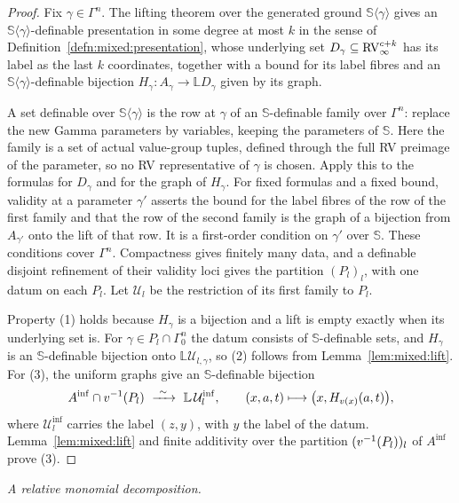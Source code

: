 \begin{proof}
Fix $\gamma\in\Gamma^n$. The lifting theorem over the generated ground
$\mathbb S\langle\gamma\rangle$ gives an
$\mathbb S\langle\gamma\rangle$-definable presentation in some degree
at most $k$ in the sense of Definition~\ref{defn:mixed:presentation},
whose underlying set $D_\gamma\subseteq\mathrm{RV}_\infty^{c+k}$ has its label as
the last $k$ coordinates, together with a bound for its label fibres and an
$\mathbb S\langle\gamma\rangle$-definable bijection
$H_\gamma:A_\gamma\to\mathbb L D_\gamma$ given by its graph.

A set definable over $\mathbb S\langle\gamma\rangle$ is the row at $\gamma$
of an $\mathbb S$-definable family over $\Gamma^n$: replace the new Gamma
parameters by variables, keeping the parameters of $\mathbb S$. Here the
family is a set of actual value-group tuples, defined through the full RV
preimage of the parameter, so no RV representative of $\gamma$ is chosen.
Apply this to the formulas for $D_\gamma$ and for the graph of $H_\gamma$.
For fixed formulas and a fixed bound, validity at a parameter $\gamma'$
asserts the bound for the label fibres of the row of the first family and
that the row of the second family is the graph of a bijection from
$A_{\gamma'}$ onto the lift of that row. It is a first-order condition on
$\gamma'$ over $\mathbb S$. These conditions cover $\Gamma^n$. Compactness
gives finitely many data, and a definable disjoint refinement of their
validity loci gives the partition $(P_l)_l$, with one datum on each $P_l$.
Let $\mathcal U_l$ be the restriction of its first family to $P_l$.

Property (1) holds because $H_\gamma$ is a bijection and a lift is empty
exactly when its underlying set is. For $\gamma\in P_l\cap\Gamma_0^n$ the
datum consists of $\mathbb S$-definable sets, and $H_\gamma$ is an
$\mathbb S$-definable bijection onto $\mathbb L\mathcal U_{l,\gamma}$, so (2)
follows from Lemma~\ref{lem:mixed:lift}. For (3), the uniform graphs give an
$\mathbb S$-definable bijection
\[
 A^{\mathrm{inf}}\cap\vv^{-1}(P_l)\ \xrightarrow{\ \sim\ }\ \mathbb L\,
 \mathcal U_l^{\mathrm{inf}},\qquad
 (x,a,t)\longmapsto\bigl(x,H_{\vv(x)}(a,t)\bigr),
\]
where $\mathcal U_l^{\mathrm{inf}}$ carries the label $(z,y)$, with $y$ the
label of the datum. Lemma~\ref{lem:mixed:lift} and finite additivity over
the partition $(v^{-1}(P_l))_l$ of $A^{\mathrm{inf}}$ prove (3).
\end{proof}

\medskip
\noindent\emph{A relative monomial decomposition.}

